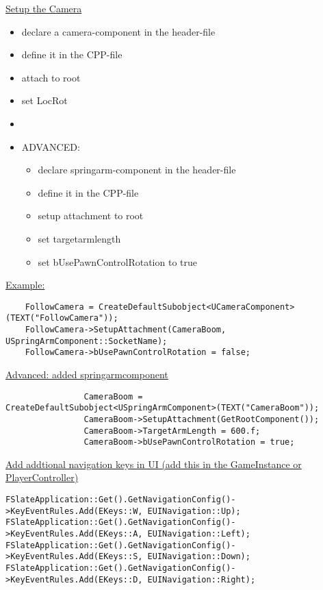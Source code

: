         \uline{Setup the Camera}
            \begin{itemize}
                \item declare a camera-component in the header-file
                \item define it in the CPP-file
                \item attach to root
                \item set LocRot
                \item 
                \item ADVANCED:
                \begin{itemize}
                    \item declare springarm-component in the header-file
                    \item define it in the CPP-file
                    \item setup attachment to root
                    \item set targetarmlength
                    \item set bUsePawnControlRotation to true
                \end{itemize}
            \end{itemize}

            \uline{Example:}
            \begin{lstlisting}
    FollowCamera = CreateDefaultSubobject<UCameraComponent>(TEXT("FollowCamera"));
    FollowCamera->SetupAttachment(CameraBoom, USpringArmComponent::SocketName);
    FollowCamera->bUsePawnControlRotation = false;
            \end{lstlisting}

            \uline{Advanced: added springarmcomponent}
            \begin{lstlisting}
                CameraBoom = CreateDefaultSubobject<USpringArmComponent>(TEXT("CameraBoom"));
                CameraBoom->SetupAttachment(GetRootComponent());
                CameraBoom->TargetArmLength = 600.f;
                CameraBoom->bUsePawnControlRotation = true;
            \end{lstlisting}
        \uline{Add addtional navigation keys in UI (add this in the GameInstance or PlayerController)}
\begin{lstlisting}
FSlateApplication::Get().GetNavigationConfig()->KeyEventRules.Add(EKeys::W, EUINavigation::Up);
FSlateApplication::Get().GetNavigationConfig()->KeyEventRules.Add(EKeys::A, EUINavigation::Left);
FSlateApplication::Get().GetNavigationConfig()->KeyEventRules.Add(EKeys::S, EUINavigation::Down);
FSlateApplication::Get().GetNavigationConfig()->KeyEventRules.Add(EKeys::D, EUINavigation::Right);
\end{lstlisting}

